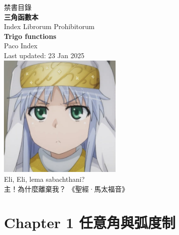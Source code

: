 \documentclass[11pt]{article}
\begin{document}
\begin{titlepage}
\begin{center}
\vspace*{4cm}
\LARGE    禁書目錄\\
\HUGE  \textbf{三角函數本}\\
\vspace{0.5cm}
\small    Index Librorum Prohibitorum\\
\normalsize  \textbf{Trigo functions}\\[1cm]
\Large Paco Index\\[0.5cm]
\Large Last updated: 23 Jan 2025\\[1.5cm]
\includegraphics[width=6cm]{images/INDEX.PNG}\\[3cm]
\LARGE Eli, Eli, lema sabachthani?\\
\large 主！為什麼離棄我？
\small 《聖經·馬太福音》
\vfill
\end{center}
\end{titlepage}
\section*{\Huge Chapter 1 任意角與弧度制}
\vspace{0.25cm}
\end{document}
